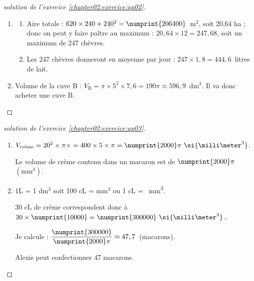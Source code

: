 \documentclass[main.tex]{subfiles}
\begin{document}
\newpage 
\begin{proof}[solution de l'exercice \ref{chapter02:exercice:ap02}]\hfill 
	\begin{enumerate}[label=\arabic*),leftmargin=*]
		\item  
		\begin{enumerate}[label=\alph*),leftmargin=*] 
		\item	Aire totale : $620 \times 240 + 240^2 = \numprint{206400}$~m$^2$, soit 20,64 ha ; donc on peut y faire paître au maximum : 
		$20,64 \times 12 = 247,68$, soit un maximum de 247 chèvres.  
		\item  
		Les 247 chèvres donneront en moyenne par jour : 
		$247 \times 1,8 = 444,6$~litres de lait.
	\end{enumerate} 
	\item Volume de la cuve B : $V_{\text{B}} = \pi \times  5^2 \times 7,6 = 190\pi \approx 596,9$~dm$^3$.  
	Il va donc acheter une cuve B.
\end{enumerate} 
\end{proof} 
\begin{proof}[solution de l'exercice \ref{chapter02:exercice:ap03}]\hfill  
	\begin{enumerate}
		\item $V_{\text{crème}} = 20^2 \times \pi \times = 400 \times  5 \times \pi = \numprint{2000}\pi ~\si{\milli\meter^3}$.
		
		Le volume de crème contenu dans un macaron est de $\numprint{2000}\pi$~$\left(\text{mm}^3\right)$.
		\item 1L = 1 dm$^3$ soit 100 cL =  mm$^3$ ou 1 cL = ~\si{\milli\meter^3}.
		
		30 cL de crème correspondent  donc à $30 \times\numprint{10000} = \numprint{300000}~\si{\milli\meter^3}$..
		
		Je calcule : $\dfrac{\numprint{300000}}{\numprint{2000}\pi} \approx 47,7$~(macarons).
		
		Alexis peut confectionner 47 macarons.
	\end{enumerate}
\end{proof}
\end{document}
